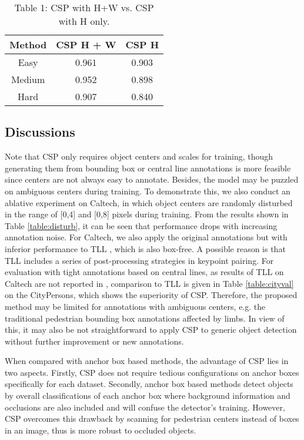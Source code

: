 \begin{table}
\begin{center}
\begin{tabular}{c|c|c}
\hline
Method & CSP H + W & CSP H \\
\hline
\hline
Easy & 0.961 & 0.903\\
\hline
Medium & 0.952 & 0.898\\
\hline
Hard & 0.907 & 0.840 \\
\hline
\end{tabular}
\end{center}
\caption{Table 1: CSP with H+W vs. CSP with H only.}
\label{table:arcomp}
\end{table}


\subsection{Discussions}
Note that CSP only requires object centers and scales for training, though generating them from bounding box or central line annotations is more feasible since centers are not always easy to annotate. Besides, the model may be puzzled on ambiguous centers during training. To demonstrate this, we also conduct an ablative experiment on Caltech, in which object centers are randomly disturbed in the range of [0,4] and [0,8] pixels during training. From the results shown in Table \ref{table:disturb}, it can be seen that performance drops with increasing annotation noise. For Caltech, we also apply the original annotations but with inferior performance to TLL \cite{Song_2018_ECCV}, which is also box-free. A possible reason is that TLL includes a series of post-processing strategies in keypoint pairing. For evaluation with tight annotations based on central lines, as results of TLL on Caltech are not reported in \cite{Song_2018_ECCV}, comparison to TLL is given in Table \ref{table:cityval} on the CityPersons, which shows the superiority of CSP. Therefore, the proposed method may be limited for annotations with ambiguous centers, e.g. the traditional pedestrian bounding box annotations affected by limbs. In view of this, it may also be not straightforward to apply CSP to generic object detection without further improvement or new annotations.

When compared with anchor box based methods, the advantage of CSP lies in two aspects. Firstly, CSP does not require tedious configurations on anchor boxes specifically for each dataset. Secondly, anchor box based methods detect objects by overall classifications of each anchor box where background information and occlusions are also included and will confuse the detector's training. However, CSP overcomes this drawback by scanning for pedestrian centers instead of boxes in an image, thus is more robust to occluded objects.


